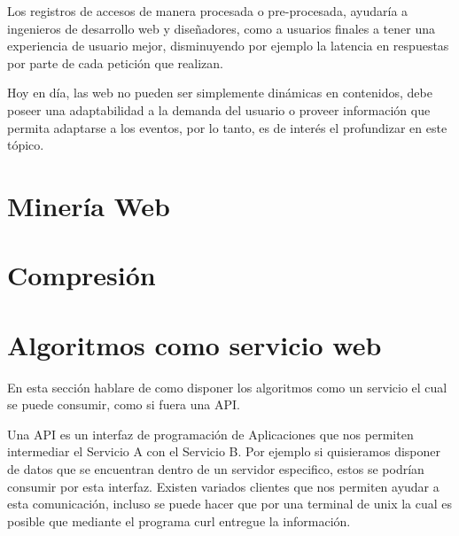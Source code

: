   Los registros de accesos de manera procesada o pre-procesada, ayudaría a ingenieros de desarrollo web y diseñadores, como a  usuarios finales a tener una experiencia de usuario mejor, disminuyendo por ejemplo la latencia en respuestas por parte de cada petición que realizan.
  
  Hoy en día, las web no pueden ser simplemente dinámicas en contenidos, debe poseer una adaptabilidad a la demanda del usuario o proveer información que permita adaptarse a los eventos, por lo tanto, es de interés el profundizar en este tópico.









\section{Minería Web}


\section{Compresión}



\section{Algoritmos como servicio web }


  En esta sección hablare de como disponer los algoritmos como un servicio el cual se puede consumir, como si fuera una API.

Una API es un interfaz de programación de Aplicaciones que nos permiten intermediar el Servicio A con el Servicio B.
Por ejemplo si quisieramos disponer de datos que se encuentran dentro de un servidor especifico, estos se podrían consumir por esta interfaz. Existen variados clientes que nos permiten ayudar a esta comunicación, incluso se puede hacer que por una terminal de unix la cual es posible que mediante el programa curl entregue la información.

